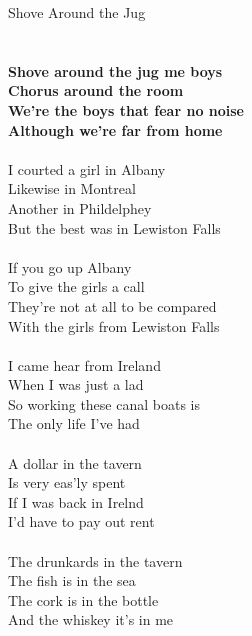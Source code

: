 \documentclass[letterpaper,9pt]{article}
\begin{document}
\newpage
{}
\huge
Shove Around the Jug\\
\\
\Large
\noindent
\\\textbf{Shove around the jug me boys
\\Chorus around the room
\\We're the boys that fear no noise
\\Although we're far from home}
\\
\\I courted a girl in Albany
\\Likewise in Montreal
\\Another in Phildelphey
\\But the best was in Lewiston Falls
\\
\\If you go up Albany
\\To give the girls a call
\\They're not at all to be compared
\\With the girls from Lewiston Falls
\\
\\I came hear from Ireland
\\When I was just a lad
\\So working these canal boats is
\\The only life I've had
\\
\\A dollar in the tavern
\\Is very eas'ly spent
\\If I was back in Irelnd
\\I'd have to pay out rent
\\
\\The drunkards in the tavern
\\The fish is in the sea
\\The cork is in the bottle
\\And the whiskey it's in me
\end{document}

